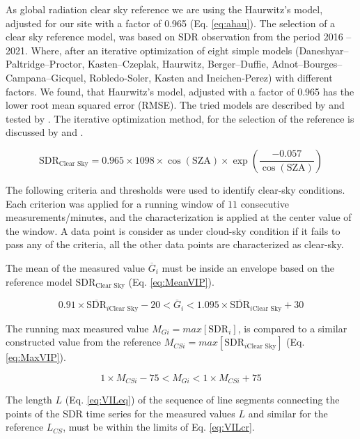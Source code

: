 \documentclass[preprint, 3p,
authoryear]{elsarticle} %
\begin{document}
As global radiation clear sky reference we are using the Haurwitz's
model, adjusted for our site with a factor of 0.965 (Eq. \ref{eq:ahau}).
The selection of a clear sky reference model, was based on SDR
observation from the period 2016 -- 2021. Where, after an iterative
optimization of eight simple models (Daneshyar--Paltridge--Proctor,
Kasten--Czeplak, Haurwitz, Berger--Duffie,
Adnot--Bourges--Campana--Gicquel, Robledo-Soler, Kasten and
Ineichen-Perez) with different factors. We found, that Haurwitz's model,
adjusted with a factor of 0.965 has the lower root mean squared error
(RMSE). The tried models are described by \citet{Reno2012} and tested by
\citet{Reno2016}. The iterative optimization method, for the selection
of the reference is discussed by \citet{Long2000} and \citet{Reno2016}.

\begin{equation}
\text{SDR}_\text{Clear Sky} = 0.965 \times 1098 \times \cos( \text{SZA} ) \times \exp \left( \frac{ - 0.057}{\cos(\text{SZA})} \right) \label{eq:ahau}
\end{equation}

The following criteria and thresholds were used to identify clear-sky
conditions. Each criterion was applied for a running window of \(11\)
consecutive measurements/minutes, and the characterization is applied at
the center value of the window. A data point is consider as under
cloud-sky condition if it fails to pass any of the criteria, all the
other data points are characterized as clear-sky.

The mean of the measured value \(\overline{G}_i\) must be inside an
envelope based on the reference model \(\text{SDR}_\text{Clear Sky}\)
(Eq. \ref{eq:MeanVIP}).

\begin{equation}
0.91 \times \overline{\text{SDR}}_{i\text{Clear Sky}} - 20
< \overline{G}_i <
1.095 \times \overline{\text{SDR}}_{i\text{Clear Sky}} + 30
\label{eq:MeanVIP}
\end{equation}

The running max measured value \(M_{Gi} = max[\text{SDR}_{i}]\), is
compared to a similar constructed value from the reference
\(M_{CSi} = max[\text{SDR}_{i\text{Clear Sky}}]\) (Eq. \ref{eq:MaxVIP}).

\begin{equation}
1 \times M_{CSi} - 75
< M_{Gi} <
1 \times M_{CSi} + 75
\label{eq:MaxVIP}
\end{equation}

The length \(L\) (Eq. \ref{eq:VILeq}) of the sequence of line segments
connecting the points of the SDR time series for the measured values
\(L\) and similar for the reference \(L_{CS}\), must be within the
limits of Eq. \ref{eq:VILcr}.
\end{document}
